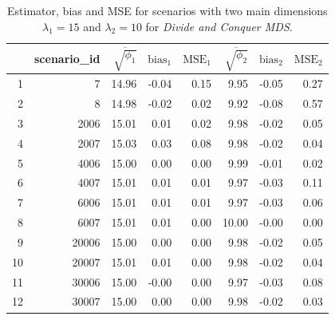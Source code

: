 \documentclass[11pt]{report}
\begin{document}
\begin{table}[ht]
\centering
\begin{tabular}{rrrrrrrr}
 & scenario\_id & $\overline{\sqrt{\phi_1}}$ & $\mbox{bias}_1$ & $\mbox{MSE}_1$ & $\overline{\sqrt{\phi_2}}$ & $\mbox{bias}_2$ & $\mbox{MSE}_2$ \\ 
  \hline
  1 & 7 & 14.96 & -0.04 & 0.15 & 9.95 & -0.05 & 0.27 \\ 
  2 & 8 & 14.98 & -0.02 & 0.02 & 9.92 & -0.08 & 0.57 \\ 
  3 & 2006 & 15.01 & 0.01 & 0.02 & 9.98 & -0.02 & 0.05 \\ 
  4 & 2007 & 15.03 & 0.03 & 0.08 & 9.98 & -0.02 & 0.04 \\ 
  5 & 4006 & 15.00 & 0.00 & 0.00 & 9.99 & -0.01 & 0.02 \\ 
  6 & 4007 & 15.01 & 0.01 & 0.01 & 9.97 & -0.03 & 0.11 \\ 
  7 & 6006 & 15.01 & 0.01 & 0.01 & 9.97 & -0.03 & 0.06 \\ 
  8 & 6007 & 15.01 & 0.01 & 0.00 & 10.00 & -0.00 & 0.00 \\ 
  9 & 20006 & 15.00 & 0.00 & 0.00 & 9.98 & -0.02 & 0.05 \\ 
  10 & 20007 & 15.01 & 0.01 & 0.00 & 9.98 & -0.02 & 0.04 \\ 
  11 & 30006 & 15.00 & -0.00 & 0.00 & 9.97 & -0.03 & 0.08 \\ 
  12 & 30007 & 15.00 & 0.00 & 0.00 & 9.98 & -0.02 & 0.03 \\ 
   \hline
\end{tabular}
\caption{Estimator, bias and MSE for scenarios with two main dimensions $\lambda_1 = 15$ and $\lambda_2 = 10$ for \textit{Divide and Conquer MDS}.}
\end{table}
\end{document}
